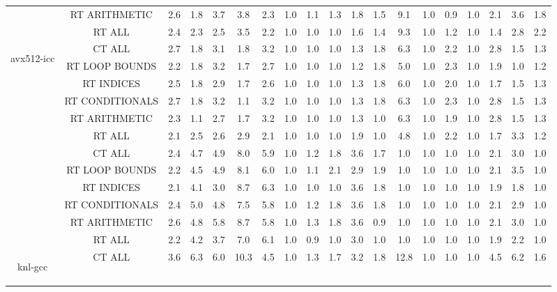 \begin{adjustbox}{center}
\begin{tabular}{|c|c|c|c|c|c|c|c|c|c|c|c|c|c|c|c|c|c|c|}
 & RT ARITHMETIC & 2.6 & 1.8 & 3.7 & 3.8 & 2.3 & 1.0 & 1.1 & 1.3 & 1.8 & 1.5 & 9.1 & 1.0 & 0.9 & 1.0 & 2.1 & 3.6 & 1.8 \\ 
 & RT ALL & 2.4 & 2.3 & 2.5 & 3.5 & 2.2 & 1.0 & 1.0 & 1.0 & 1.6 & 1.4 & 9.3 & 1.0 & 1.2 & 1.0 & 1.4 & 2.8 & 2.2 \\ 
\hline 
  \multirow{7}{*}{\begin{turn}{90}avx512-icc\end{turn}} & CT ALL &2.7 & 1.8 & 3.1 & 1.8 & 3.2 & 1.0 & 1.0 & 1.0 & 1.3 & 1.8 & 6.3 & 1.0 & 2.2 & 1.0 & 2.8 & 1.5 & 1.3 \\ 
 & RT LOOP BOUNDS & 2.2 & 1.8 & 3.2 & 1.7 & 2.7 & 1.0 & 1.0 & 1.0 & 1.2 & 1.8 & 5.0 & 1.0 & 2.3 & 1.0 & 1.9 & 1.0 & 1.2 \\ 
 & RT INDICES & 2.5 & 1.8 & 2.9 & 1.7 & 2.6 & 1.0 & 1.0 & 1.0 & 1.3 & 1.8 & 6.0 & 1.0 & 2.0 & 1.0 & 1.7 & 1.5 & 1.3 \\ 
 & RT CONDITIONALS & 2.7 & 1.8 & 3.2 & 1.1 & 3.2 & 1.0 & 1.0 & 1.0 & 1.3 & 1.8 & 6.3 & 1.0 & 2.3 & 1.0 & 2.8 & 1.5 & 1.3 \\ 
 & RT ARITHMETIC & 2.3 & 1.1 & 2.7 & 1.7 & 3.2 & 1.0 & 1.0 & 1.0 & 1.3 & 1.0 & 6.3 & 1.0 & 1.9 & 1.0 & 2.8 & 1.5 & 1.3 \\ 
 & RT ALL & 2.1 & 2.5 & 2.6 & 2.9 & 2.1 & 1.0 & 1.0 & 1.0 & 1.9 & 1.0 & 4.8 & 1.0 & 2.2 & 1.0 & 1.7 & 3.3 & 1.2 \\ 
\hline 
  \multirow{7}{*}{\begin{turn}{90}knl-clang\end{turn}} & CT ALL &2.4 & 4.7 & 4.9 & 8.0 & 5.9 & 1.0 & 1.2 & 1.8 & 3.6 & 1.7 & 1.0 & 1.0 & 1.0 & 1.0 & 2.1 & 3.0 & 1.0 \\ 
 & RT LOOP BOUNDS & 2.2 & 4.5 & 4.9 & 8.1 & 6.0 & 1.0 & 1.1 & 2.1 & 2.9 & 1.9 & 1.0 & 1.0 & 1.0 & 1.0 & 2.1 & 3.5 & 1.0 \\ 
 & RT INDICES & 2.1 & 4.1 & 3.0 & 8.7 & 6.3 & 1.0 & 1.0 & 1.0 & 3.6 & 1.8 & 1.0 & 1.0 & 1.0 & 1.0 & 1.9 & 1.8 & 1.0 \\ 
 & RT CONDITIONALS & 2.4 & 5.0 & 4.8 & 7.5 & 5.8 & 1.0 & 1.2 & 1.8 & 3.6 & 1.8 & 1.0 & 1.0 & 1.0 & 1.0 & 2.1 & 2.9 & 1.0 \\ 
 & RT ARITHMETIC & 2.6 & 4.8 & 5.8 & 8.7 & 5.8 & 1.0 & 1.3 & 1.8 & 3.6 & 0.9 & 1.0 & 1.0 & 1.0 & 1.0 & 2.1 & 3.0 & 1.0 \\ 
 & RT ALL & 2.2 & 4.2 & 3.7 & 7.0 & 6.1 & 1.0 & 0.9 & 1.0 & 3.0 & 1.0 & 1.0 & 1.0 & 1.0 & 1.0 & 1.9 & 2.2 & 1.0 \\ 
\hline 
  \multirow{7}{*}{\begin{turn}{90}knl-gcc\end{turn}} & CT ALL &3.6 & 6.3 & 6.0 & 10.3 & 4.5 & 1.0 & 1.3 & 1.7 & 3.2 & 1.8 & 12.8 & 1.0 & 1.0 & 1.0 & 4.5 & 6.2 & 1.6 \\ 

\end{tabular}
\end{adjustbox}
